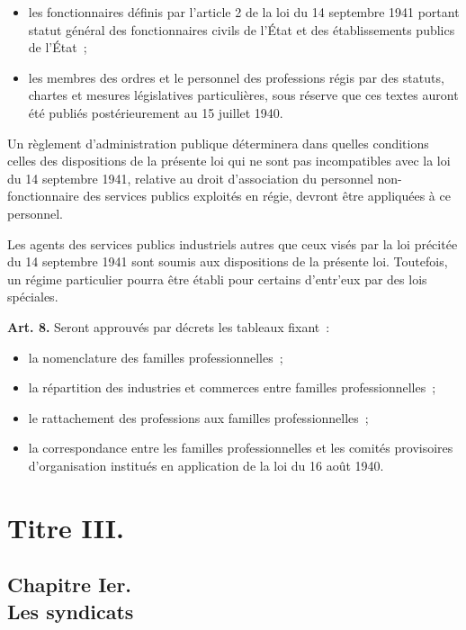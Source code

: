 \documentclass[french,twoside]{book} %
\newcommand{\labelchar}[1]{\textbf{\color{rubric} #1}}
\begin{document}
\begin{itemize}[itemsep=0pt,]
\item les fonctionnaires définis par l’article 2 de la loi du 14 septembre 1941 portant statut général des fonctionnaires civils de l’État et des établissements publics de l’État ;
\item les membres des ordres et le personnel des professions régis par des statuts, chartes et mesures législatives particulières, sous réserve que ces textes auront été publiés postérieurement au 15 juillet 1940.
\end{itemize}

\noindent Un règlement d’administration publique déterminera dans quelles conditions celles des dispositions de la présente loi qui ne sont pas incompatibles avec la loi du 14 septembre 1941, relative au droit d’association du personnel non-fonctionnaire des services publics exploités en régie, devront être appliquées à ce personnel.\par
Les agents des services publics industriels autres que ceux visés par la loi précitée du 14 septembre 1941 sont soumis aux dispositions de la présente loi. Toutefois, un régime particulier pourra être établi pour certains d’entr’eux par des lois spéciales.\par
\bigbreak
\noindent \labelchar{Art. 8.} Seront approuvés par décrets les tableaux fixant :\par

\begin{itemize}[itemsep=0pt,]
\item la nomenclature des familles professionnelles ;
\item la répartition des industries et commerces entre familles professionnelles ;
\item le rattachement des professions aux familles professionnelles ;
\item la correspondance entre les familles professionnelles et les comités provisoires d’organisation institués en application de la loi du 16 août 1940.
\end{itemize}


\section[{Titre III.}]{Titre III.}
\renewcommand{\leftmark}{Titre III.}


\subsection[{Chapitre Ier. Les syndicats}]{Chapitre Ier. \\
Les syndicats}
\end{document}

